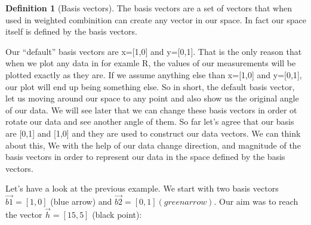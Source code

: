 \documentclass[
]{book}
\theoremstyle{definition}
\newtheorem{definition}{Definition}[chapter]
\theoremstyle{definition}
\theoremstyle{definition}
\theoremstyle{remark}
\begin{document}
\begin{definition}[Basis vectors]
\protect\hypertarget{def:bvectors}{}{\label{def:bvectors} \iffalse (Basis vectors) \fi{} }
The basis vectors are a set of vectors that when used in weighted combinition can create any vector in our space. In fact our space itself is defined by the basis vectors.

Our ``default'' basis vectors are x={[}1,0{]} and y={[}0,1{]}. That is the only reason that when we plot any data in for examle R, the values of our measurements will be plotted exactly as they are. If we assume anything else than x={[}1,0{]} and y={[}0,1{]}, our plot will end up being something else. So in short, the default basis vector, let us moving around our space to any point and also show us the original angle of our data. We will see later that we can change these basis vectors in order ot rotate our data and see another angle of them. So far let's agree that our basis are {[}0,1{]} and {[}1,0{]} and they are used to construct our data vectors. We can think about this, We with the help of our data change direction, and magnitude of the basis vectors in order to represent our data in the space defined by the basis vectors.
\end{definition}

Let's have a look at the previous example. We start with two basis vectors \(\vec{b1}=[1,0]\) (blue arrow) and \(\vec{b2}=[0,1] (green arrow)\). Our aim was to reach the vector \(\vec{h}=[15,5]\) (black point):
\end{document}
